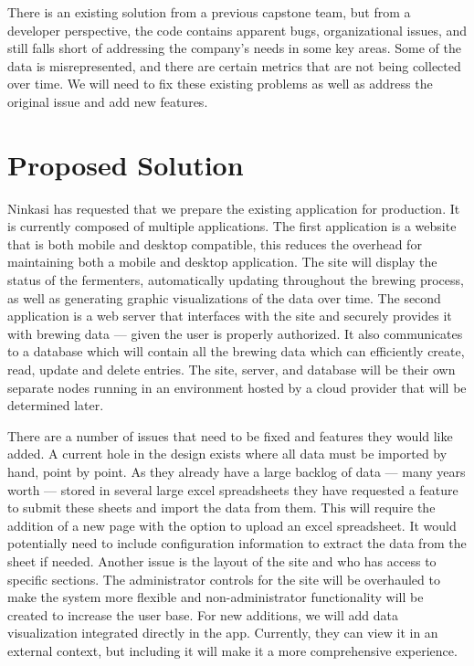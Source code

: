 \documentclass[draftclsnofoot,onecolumn,journal,letterpaper,10pt]{IEEEtran}
\begin{document}
There is an existing solution from a previous capstone team, but from a developer perspective, the code contains apparent bugs, organizational issues, and still falls short of addressing the company’s needs in some key areas. Some of the data is misrepresented, and there are certain metrics that are not being collected over time. We will need to fix these existing problems as well as address the original issue and add new features.

\section{Proposed Solution}
Ninkasi has requested that we prepare the existing application for production. It is currently composed of multiple applications. The first application is a website that is both mobile and desktop compatible, this reduces the overhead for maintaining both a mobile and desktop application. The site will display the status of the fermenters, automatically updating throughout the brewing process, as well as generating graphic visualizations of the data over time. The second application is a web server that interfaces with the site and securely provides it with brewing data --- given the user is properly authorized. It also communicates to a database which will contain all the brewing data which can efficiently create, read, update and delete entries. The site, server, and database will be their own separate nodes running in an environment hosted by a cloud provider that will be determined later. 

There are a number of issues that need to be fixed and features they would like added. A current hole in the design exists where all data must be imported by hand, point by point.  As they already have a large backlog of data --- many years worth --- stored in several large excel spreadsheets they have requested a feature to submit these sheets and import the data from them.  This will require the addition of a new page with the option to upload an excel spreadsheet.  It would potentially need to include configuration information to extract the data from the sheet if needed. Another issue is the layout of the site and who has access to specific sections. The administrator controls for the site will be overhauled to make the system more flexible and non-administrator functionality will be created to increase the user base. For new additions, we will add data visualization integrated directly in the app. Currently, they can view it in an external context, but including it will make it a more comprehensive experience.
\end{document}
